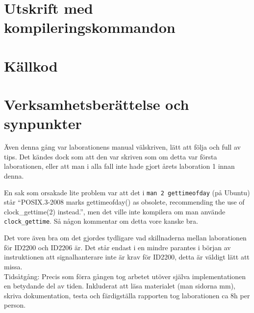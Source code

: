 \documentclass[a4paper]{article}
\begin{document}
\section*{Utskrift med kompileringskommandon}
%

\section*{Källkod}


\section*{Verksamhetsberättelse och synpunkter}
Även denna gång var laborationens manual välskriven, lätt att följa och full av tips. Det kändes dock som att den var skriven som om detta var första laborationen, eller att man i alla fall inte hade gjort årets laboration 1 innan denna.

En sak som orsakade lite problem var att det i \texttt{man 2 gettimeofday} (på Ubuntu) står ``POSIX.3-2008 marks gettimeofday() as obsolete, recommending the use of clock\_gettime(2) instead.'', men det ville inte kompilera om man använde \texttt{clock\_gettime}. Så någon kommentar om detta vore kanske bra.

Det vore även bra om det gjordes tydligare vad skillnaderna mellan laborationen för ID2200 och ID2206 är. Det står endast i en mindre parantes i början av instruktionen att signalhanterare inte är krav för ID2200, detta är väldigt lätt att missa.
\\
Tidsåtgång: Precis som förra gången tog arbetet utöver själva implementationen en betydande del av tiden. Inkluderat att läsa materialet (man sidorna mm), skriva dokumentation, testa och färdigställa rapporten tog laborationen ca 8h per person.
\end{document}
